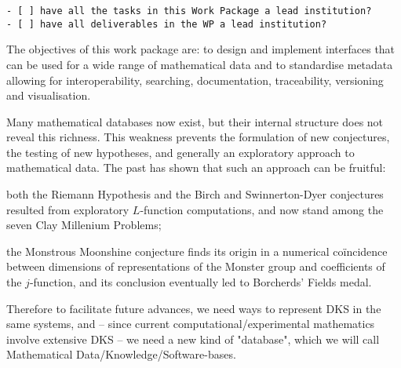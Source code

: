 \begin{draft}
\begin{verbatim}
- [ ] have all the tasks in this Work Package a lead institution?
- [ ] have all deliverables in the WP a lead institution?
\end{verbatim}
\end{draft}



\begin{workpackage}[id=dksbases,wphases=1-48!.5,
  title=Data/Knowledge/Software-Bases,lead=JU,
  ZHRM=12,JURM=36,USHRM=12,UWRM=25,SARM=10,LLRM=2,PSRM=4]


\begin{wpobjectives}
  The objectives of this work package are: to design and implement interfaces that can be
  used for a wide range of mathematical data and to standardise metadata allowing for
  interoperability, searching, documentation, traceability, versioning and visualisation.
\end{wpobjectives}

\begin{wpdescription}
  Many mathematical databases now exist, but their internal structure does not reveal this
  richness. This weakness prevents the formulation of new conjectures, the testing of new
  hypotheses, and generally an exploratory approach to mathematical data. The past has
  shown that such an approach can be fruitful:
  \begin{compactitem}
  \item both the Riemann Hypothesis and the Birch and Swinnerton-Dyer conjectures resulted
    from exploratory $L$-function computations, and now stand among the seven Clay
    Millenium Problems;
  \item the Monstrous Moonshine conjecture finds its origin in a numerical co\"incidence
    between dimensions of representations of the Monster group and coefficients of the
    $j$-function, and its conclusion eventually led to Borcherds' Fields medal.
  \end{compactitem}

  Therefore to facilitate future advances, we need ways to represent DKS in the same
  systems, and -- since current computational/experimental mathematics involve extensive
  DKS -- we need a new kind of "database", which we will call Mathematical
  Data/Knowledge/Software-bases.


\end{wpdescription}
\end{workpackage}
